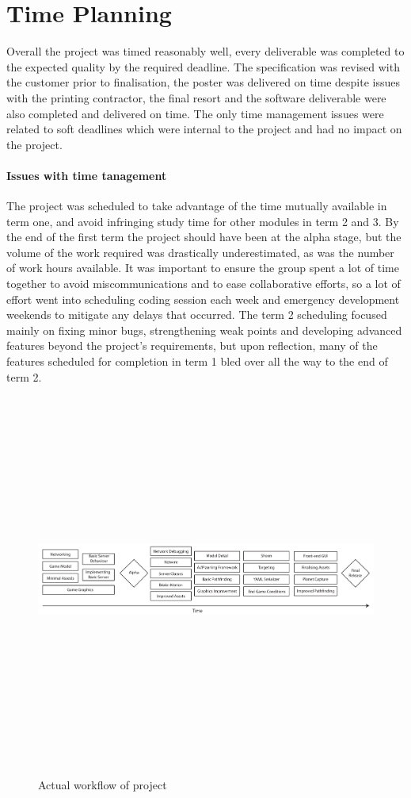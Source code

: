 \section{Time Planning}

Overall the project was timed reasonably well, every deliverable was completed to the expected quality by the required deadline. The specification was revised with the customer prior to finalisation, the poster was delivered on time despite issues with the printing contractor, the final resort and the software deliverable were also completed and delivered on time. The only time management issues were related to soft deadlines which were internal to the project and had no impact on the project.

\paragraph{Issues with time tanagement}
The project was scheduled to take advantage of the time mutually available in term one, and avoid infringing study time for other modules in term 2 and 3. 
By the end of the first term the project should have been at the alpha stage, but the volume of the work required was drastically underestimated, as was the number of work hours available. It was important to ensure the group spent a lot of time together to avoid miscommunications and to ease collaborative efforts, so a lot of effort went into scheduling coding session each week and emergency development weekends to mitigate any delays that occurred. The term 2 scheduling focused mainly on fixing minor bugs, strengthening weak points and developing advanced features beyond the project's requirements, but upon reflection, many of the features scheduled for completion in term 1 bled over all the way to the end of term 2. 

\begin{figure}
	\includegraphics[height=33em]{res/pm/actual_workflow_diagram}
	\label{fig:actual_workflow_diagram}
	\caption{Actual workflow of project}
\end{figure}

